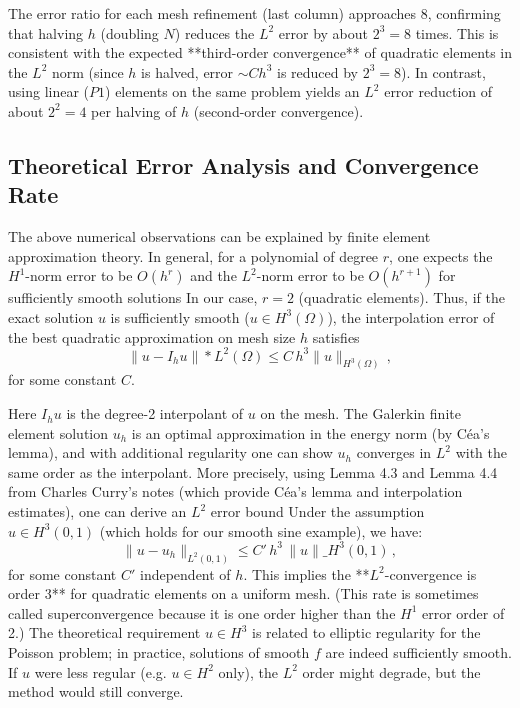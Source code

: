 \documentclass[a4paper,10pt]{article}
\begin{document}
The error ratio for each mesh refinement (last column) approaches 8, confirming that halving $h$ (doubling $N$) reduces the $L^2$ error by about $2^3=8$ times. 
This is consistent with the expected **third-order convergence** of quadratic elements in the $L^2$ norm (since $h$ is halved, error $\sim Ch^3$ is reduced by $2^3=8$). In contrast, using linear ($P1$) elements on the same problem yields an $L^2$ error reduction of about $2^2=4$ per halving of $h$ (second-order convergence).

\subsection{Theoretical Error Analysis and Convergence Rate}

The above numerical observations can be explained by finite element approximation theory. 
In general, for a polynomial of degree $r$, one expects the $H^1$-norm error to be $O(h^r)$ and the $L^2$-norm error to be $O(h^{r+1})$ for sufficiently smooth solutions 
In our case, $r=2$ (quadratic elements). 
Thus, if the exact solution $u$ is sufficiently smooth ($u \in H^3(\Omega)$), the interpolation error of the best quadratic approximation on mesh size $h$ satisfies
$$ \|u - I_h u\|*{L^2(\Omega)} \le C\,h^3 \|u\|_{H^3(\Omega)}\, ,$$
for some constant $C$.


Here $I_h u$ is the degree-2 interpolant of $u$ on the mesh. The Galerkin finite element solution $u_h$ is an optimal approximation in the energy norm (by Céa's lemma), and with additional regularity one can show $u_h$ converges in $L^2$ with the same order as the interpolant. 
More precisely, using Lemma 4.3 and Lemma 4.4 from Charles Curry's notes (which provide Céa's lemma and interpolation estimates), one can derive an $L^2$ error bound 
Under the assumption $u \in H^3(0,1)$ (which holds for our smooth sine example), we have:
$$ 
\|u - u_h\|_{L^2(0,1)} \le C'\,h^3\,\|u\|\_{H^3(0,1)}\,, 
$$
for some constant $C'$ independent of $h$. This implies the **$L^2$-convergence is order 3** for quadratic elements on a uniform mesh. (This rate is sometimes called superconvergence because it is one order higher than the $H^1$ error order of 2.) 
The theoretical requirement $u\in H^3$ is related to elliptic regularity for the Poisson problem; in practice, solutions of smooth $f$ are indeed sufficiently smooth. 
If $u$ were less regular (e.g. $u\in H^2$ only), the $L^2$ order might degrade, but the method would still converge.
\end{document}
